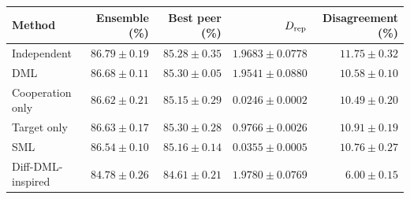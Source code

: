 \begin{tabular}{lrrrr}
\toprule
Method & Ensemble (\%) & Best peer (\%) & $D_{\rm rep}$ & Disagreement (\%) \\
\midrule
Independent & $86.79\pm0.19$ & $85.28\pm0.35$ & $1.9683\pm0.0778$ & $11.75\pm0.32$ \\
DML & $86.68\pm0.11$ & $85.30\pm0.05$ & $1.9541\pm0.0880$ & $10.58\pm0.10$ \\
Cooperation only & $86.62\pm0.21$ & $85.15\pm0.29$ & $0.0246\pm0.0002$ & $10.49\pm0.20$ \\
Target only & $86.63\pm0.17$ & $85.30\pm0.28$ & $0.9766\pm0.0026$ & $10.91\pm0.19$ \\
SML & $86.54\pm0.10$ & $85.16\pm0.14$ & $0.0355\pm0.0005$ & $10.76\pm0.27$ \\
Diff-DML-inspired & $84.78\pm0.26$ & $84.61\pm0.21$ & $1.9780\pm0.0769$ & $6.00\pm0.15$ \\
\bottomrule
\end{tabular}
